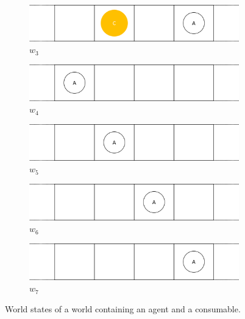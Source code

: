 \begin{figure}[H]
\begin{subfigure}{0.48\textwidth}
  \end{subfigure}%
  \hfill
  \begin{subfigure}{0.48\textwidth}
    \centering
    \includegraphics[width=\textwidth]{5BeyondSBDRL/Old/Images/Consumable_world_states/w3.png}
    \caption{$w_{3}$}
    \label{fig:w3}
  \end{subfigure}%
  \vspace{0.5cm}
  \begin{subfigure}{0.48\textwidth}
    \centering
    \includegraphics[width=\textwidth]{5BeyondSBDRL/Old/Images/Consumable_world_states/w4.png}
    \caption{$w_{4}$}
    \label{fig:w4}
  \end{subfigure}%
  \hfill
  \begin{subfigure}{0.48\textwidth}
    \centering
    \includegraphics[width=\textwidth]{5BeyondSBDRL/Old/Images/Consumable_world_states/w5.png}
    \caption{$w_{5}$}
    \label{fig:w5}
  \end{subfigure}%
  \vspace{0.5cm}
  \begin{subfigure}{0.48\textwidth}
    \centering
    \includegraphics[width=\textwidth]{5BeyondSBDRL/Old/Images/Consumable_world_states/w6.png}
    \caption{$w_{6}$}
    \label{fig:w6}
  \end{subfigure}%
  \hfill
  \begin{subfigure}{0.48\textwidth}
    \centering
    \includegraphics[width=\textwidth]{5BeyondSBDRL/Old/Images/Consumable_world_states/w7.png}
    \caption{$w_{7}$}
    \label{fig:w7}
  \end{subfigure}%
  
  \caption{World states of a world containing an agent and a consumable.}
  \label{fig:consumable_world_states}
\end{figure}

